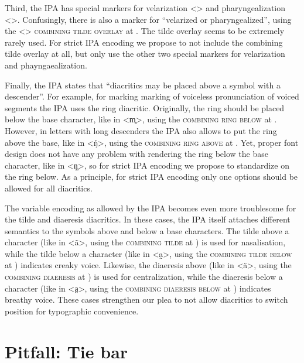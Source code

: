 Third, the IPA has special markers for velarization <> and
pharyngealization <>. Confusingly, there is also a marker for
``velarized or pharyngealized'', using the <> \textsc{combining tilde
overlay} at . The tilde overlay seems to be extremely rarely used. For
strict IPA encoding we propose to not include the combining tilde overlay at
all, but only use the other two special markers for velarization and
phayngaealization.

Finally, the IPA states that ``diacritics may be placed above a symbol with a
descender''. For example, for marking marking of voiceless pronunciation of
voiced segments the IPA uses the ring diacritic. Originally, the ring should be
placed below the base character, like in <m̥>, using the \textsc{combining ring
below} at . However, in letters with long descenders the IPA also
allows to put the ring above the base, like in <ŋ̊>, using the \textsc{combining
ring above} at . Yet, proper font design does not have any problem
with rendering the ring below the base character, like in <ŋ̥>, so for strict
IPA encoding we propose to standardize on the ring below. As a principle, for
strict IPA encoding only one options should be allowed for all diacritics.

The variable encoding as allowed by the IPA becomes even more troublesome for
the tilde and diaeresis diacritics. In these cases, the IPA itself attaches
different semantics to the symbols above and below a base characters. The tilde
above a character (like in <ã>, using the \textsc{combining tilde} at
) is used for nasalisation, while the tilde below a character (like in
<a̰>, using the \textsc{combining tilde below} at ) indicates creaky
voice. Likewise, the diaeresis above (like in <ä>, using the \textsc{combining
diaeresis} at ) is used for centralization, while the diaeresis below
a character (like in <a̤>, using the \textsc{combining diaeresis below} at
) indicates breathy voice. These cases strengthen our plea to not
allow diacritics to switch position for typographic convenience.

\section{Pitfall: Tie bar}
\label{pitfall-tie-bar}

